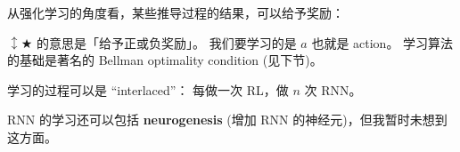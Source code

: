 \documentclass[12pt]{article}
\newcommand{\tab}{\hspace*{1cm}}
\begin{document}



从强化学习的角度看，某些推导过程的结果，可以给予奖励： \par
\begin{figure}[H]
\centering
{}
\end{figure}
$\updownarrow \bigstar$ 的意思是「给予正或负奖励」。  我们要学习的是 $a$ 也就是 action。  学习算法的基础是著名的 Bellman optimality condition (见下节)。

学习的过程可以是 ``interlaced''： 每做一次 RL，做 $n$ 次 RNN。


RNN 的学习还可以包括 \textbf{neurogenesis} (增加 RNN 的神经元)，但我暂时未想到这方面。

\end{document}
